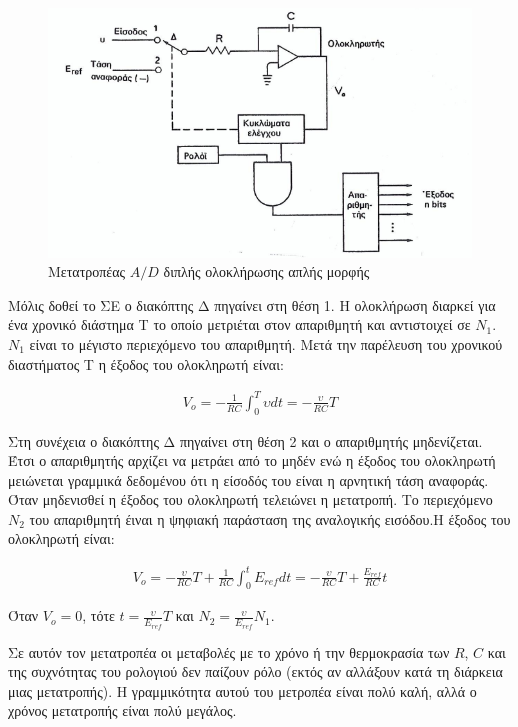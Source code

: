 \documentclass{article}
\begin{document}
\begin{figure}[h!]
    \includegraphics[width=\linewidth]{AD2olok.png}
    \caption{Μετατροπέας $A/D$ διπλής ολοκλήρωσης απλής μορφής}
\end{figure}
Μόλις δοθεί το ΣΕ ο διακόπτης Δ πηγαίνει στη θέση 1. Η ολοκλήρωση διαρκεί για ένα χρονικό διάστημα Τ το οποίο μετριέται στον απαριθμητή και αντιστοιχεί σε $Ν_1$. $Ν_1$ είναι το μέγιστο 
περιεχόμενο του απαριθμητή. Μετά την παρέλευση του χρονικού διαστήματος Τ η έξοδος του ολοκληρωτή είναι: 

\begin{align*}
    V_o=-\frac{1}{RC}\int^{T}_{0} \upsilon dt=-\frac{\upsilon}{RC}T
\end{align*}

Στη συνέχεια ο διακόπτης Δ πηγαίνει στη θέση 2 και ο απαριθμητής μηδενίζεται. Έτσι ο απαριθμητής αρχίζει να μετράει από το μηδέν ενώ η έξοδος του ολοκληρωτή μειώνεται γραμμικά δεδομένου
ότι η είσοδός του είναι η αρνητική τάση αναφοράς. Όταν μηδενισθεί η έξοδος του ολοκληρωτή τελειώνει η μετατροπή. Το περιεχόμενο $Ν_2$ του απαριθμητή έιναι η ψηφιακή παράσταση της 
αναλογικής εισόδου.Η έξοδος του ολοκληρωτή είναι: 

\begin{align*}
    V_o = -\frac{\upsilon}{RC}T + \frac{1}{RC} \int^t_0 E_{ref}dt = - \frac{\upsilon}{RC}T + \frac{E_{ref}}{RC}t
\end{align*}

Όταν $V_o = 0$, τότε $t=\frac{\upsilon}{E_{ref}}T$ και $N_2=\frac{\upsilon}{E_{ref}}N_1$.

Σε αυτόν τον μετατροπέα οι μεταβολές με το χρόνο ή την θερμοκρασία των $R$, $C$ και της συχνότητας του ρολογιού δεν παίζουν ρόλο (εκτός αν αλλάξουν κατά τη διάρκεια μιας μετατροπής).
Η γραμμικότητα αυτού του μετροπέα είναι πολύ καλή, αλλά ο χρόνος μετατροπής είναι πολύ μεγάλος.
\end{document}
